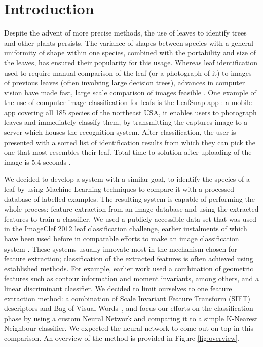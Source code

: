 \section{Introduction}
Despite the advent of more precise methods, the use of leaves to identify trees and other plants persists. The variance of shapes between species with a general uniformity of shape within one species, combined with the portability and size of the leaves, has ensured their popularity for this usage. 
Whereas leaf identification used to require manual comparison of the leaf (or a photograph of it) to images of previous leaves (often involving large decision trees), advances in computer vision have made fast, large scale comparison of images feasible \cite{Belh2008}. One example of the use of computer image classification for leafs is the LeafSnap app \cite{Kuma2012}: a mobile app covering all 185 species of the northeast USA, it enables users to photograph leaves and immediately classify them, by transmitting the captures image to a server which houses the recognition system. After classification, the user is presented with a sorted list of identification results from which they can pick the one that most resembles their leaf. Total time to solution after uploading of the image is 5.4 seconds \cite{Kuma2012}.

We decided to develop a system with a similar goal, to identify the species of a leaf by using Machine Learning techniques to compare it with a processed database of labelled examples. The resulting system is capable of performing the whole process: feature extraction from an image database and using the extracted features to train a classifier. We used a publicly accessible data set that was used in the ImageClef 2012 leaf classification challenge, earlier instalments of which have been used before in comparable efforts to make an image classification system \cite{Goea2011}. These systems usually innovate most in the mechanism chosen for feature extraction; classification of the extracted features is often achieved using established methods. For example, earlier work \cite{Kaly2015} used a combination of geometric features such as contour information and moment invariants, among others, and a linear discriminant classifier.
We decided to limit ourselves to one feature extraction method: a combination of Scale Invariant Feature Transform (SIFT) descriptors and Bag of Visual Words~\cite{Zhan2010}, and focus our efforts on the classification phase by using a custom Neural Network and comparing it to a simple K-Nearest Neighbour classifier.
We expected the neural network to come out on top in this comparison.
An overview of the method is provided  in Figure \vref{fig:overview}.

